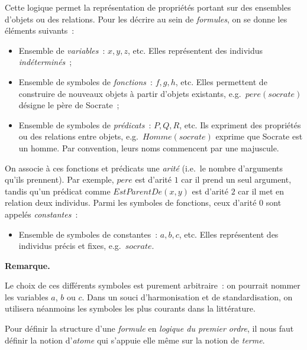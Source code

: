 \documentclass[11pt]{article}
\newenvironment{remarque}{%
    \begin{mdframed}[
        linecolor=sectioncolor!40,
        linewidth=0.8pt,
        backgroundcolor=sectioncolor!5,
        innerleftmargin=10pt,
        innerrightmargin=10pt,
        innertopmargin=6pt,
        innerbottommargin=6pt,
        skipabove=8pt,
        skipbelow=8pt
    ]
    \noindent\textbf{\small\color{sectioncolor}Remarque.}\enspace\small\itshape
}{%
    \end{mdframed}
}
\begin{document}
\vspace{0.2cm}
Cette logique permet la représentation de propriétés portant 
sur des ensembles d'objets ou des relations. Pour les décrire 
au sein de \textit{formules}, on se donne les éléments suivants~:
\begin{itemize}
    \item Ensemble de \textit{variables}~: $x, y, z$, etc. Elles représentent des individus \textit{indéterminés}~;
    \item Ensemble de symboles de \textit{fonctions}~: $f, g, h$, etc. Elles permettent de construire de nouveaux objets à partir d'objets existants, e.g.~$\mathit{pere}(\mathit{socrate})$ désigne le père de Socrate~;
    \item Ensemble de symboles de \textit{prédicats}~: $P, Q, R$, etc. Ils expriment des propriétés ou des relations entre objets, e.g.~$\mathit{Homme}(\mathit{socrate})$ exprime que Socrate est un homme. Par convention, leurs noms commencent par une majuscule.
\end{itemize}
On associe à ces fonctions et prédicats une \textit{arité} 
(i.e.~le nombre d'arguments qu'ils prennent). Par exemple, 
$\mathit{pere}$ est d'arité $1$ car il prend un seul argument, 
tandis qu'un prédicat comme $\mathit{EstParentDe}(x, y)$ est d'arité 
$2$ car il met en relation deux individus. Parmi les symboles de 
fonctions, ceux d'arité $0$ sont appelés \textit{constantes}~:
\begin{itemize}
    \item Ensemble de symboles de constantes~: $a, b, c$, etc. Elles représentent des individus précis et fixes, e.g.~$\mathit{socrate}$.
\end{itemize}


\begin{remarque}
    Le choix de ces différents symboles est purement arbitraire~: 
    on pourrait nommer les variables $a$, $b$ ou $c$. 
    Dans un souci d'harmonisation et de standardisation, 
    on utilisera néanmoins les symboles les plus courants dans la littérature.
\end{remarque}
Pour définir la structure d'une \textit{formule} en \textit{logique du premier ordre}, 
il nous faut définir la notion d'\textit{atome} qui s'appuie elle même 
sur la notion de \textit{terme}.
\end{document}
